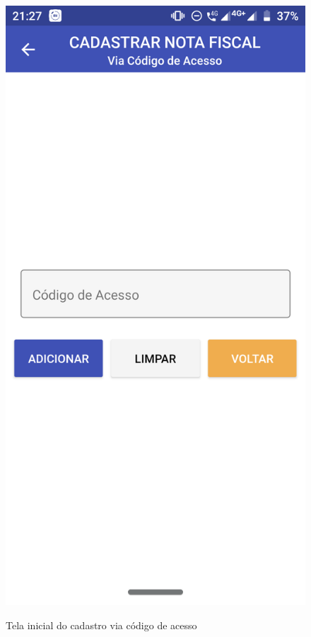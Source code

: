 \newpage
\begin{figure}[h]
    \centering
    \caption{Tela inicial do cadastro via código de acesso}
    \includegraphics[scale=0.15]{tcc/figures/app/app_codigo_acesso.png}
    \label{appCodigoAcessoInicialFig}
\end{figure}

